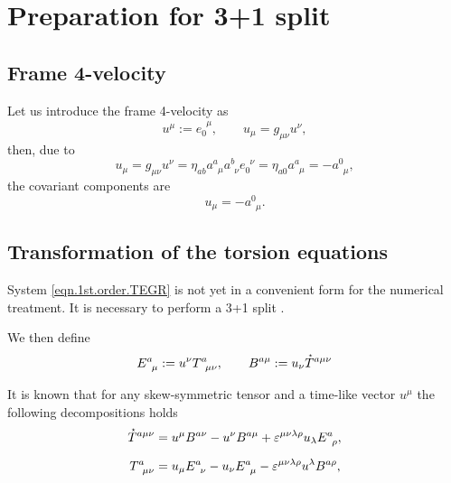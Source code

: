 \documentclass[
10pt, %
a4paper, %
oneside, %
headinclude,footinclude, %
BCOR5mm, %
]{scrartcl}
\newcommand{\itetr}[2]{e^{\phantom{#2}#1}_{#2}}
\newcommand{\tetr}[2]{a^{#1}_{\phantom{#1}#2}}
\newcommand{\Tors}[2]{T^{#1}_{\phantom{a}#2}}
\newcommand{\ET}[2]{E^{#1}_{\phantom{#1}#2}}	%
\newcommand{\BT}[2]{B^{#1#2}}	%
\newcommand{\veps}{\varepsilon}
\newcommand{\HT}[1]{\accentset{\star}{T}^{#1}}
\begin{document}
\section{Preparation for 3+1 split}


\subsection{Frame 4-velocity}

Let us introduce the frame 4-velocity as
\begin{equation}\label{eqn.4velocity}
u^\mu := \itetr{\mu}{0}, \qquad u_\mu = g_{\mu\nu}u^\nu,
\end{equation}
then, due to
\begin{equation}
u_\mu = g_{\mu\nu} u^\nu = \eta_{ab}\tetr{a}{\mu}\tetr{b}{\nu}\itetr{\nu}{0} = 
\eta_{a0}\tetr{a}{\mu} = -\tetr{0}{\mu},
\end{equation}\label{eqn.4velocity.cov}
the covariant components are
\begin{equation}
u_\mu = -\tetr{0}{\mu}.
\end{equation}


\subsection{Transformation of the torsion equations}\label{sec.transform.potential}


System \eqref{eqn.1st.order.TEGR} is not yet in a convenient form for the numerical treatment. It 
is necessary to perform a 3+1 split \cite{Alcubierre2008}. 


We then define 
\begin{equation}
\ET{a}{\mu} := u^\nu \Tors{a}{\mu\nu}, \qquad  \BT{a}{\mu} := u_\nu\HT{a\mu\nu}
\end{equation}

It is known that for any skew-symmetric tensor and a time-like vector $ u^\mu $ the following 
decompositions holds
\begin{subequations}\label{eqn.T.decompos}
\begin{align}
\HT{a\mu\nu} &= u^\mu \BT{a}{\nu} - u^\nu \BT{a}{\mu} + \veps^{\mu\nu\lambda\rho}u_\lambda 
\ET{a}{\rho},\\[2mm]
\Tors{a}{\mu\nu} &= u_\mu \ET{a}{\nu} - u_\nu \ET{a}{\mu} - \veps^{\mu\nu\lambda\rho}u^\lambda 
\BT{a}{\rho},
\end{align}
\end{subequations}
\end{document}
